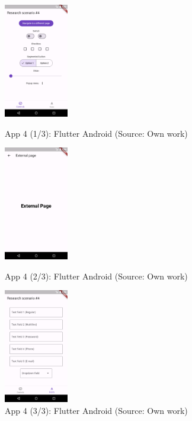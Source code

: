 \begin{figure}[H]
  \begin{minipage}{.31\textwidth}
    \centering
    \includegraphics[height=50mm]{img/app4_1_flutter_android}
    \caption{App 4 (1/3): Flutter Android (Source: Own work)}
    \label{fig:app4_1_flutter_android}
  \end{minipage}
  \hfill
  \begin{minipage}{.31\textwidth}
    \centering
    \includegraphics[height=50mm]{img/app4_2_flutter_android}
    \caption{App 4 (2/3): Flutter Android (Source: Own work)}
    \label{fig:app4_2_flutter_android}
  \end{minipage}
  \hfill
  \begin{minipage}{.31\textwidth}
    \centering
    \includegraphics[height=50mm]{img/app4_3_flutter_android}
    \caption{App 4 (3/3): Flutter Android (Source: Own work)}
    \label{fig:app4_3_flutter_android}
  \end{minipage}
\end{figure}

